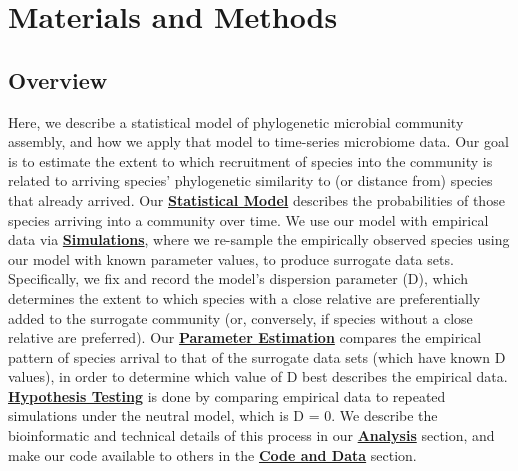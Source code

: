 \documentclass{article}
\begin{document}
\section{Materials and Methods}

\subsection{Overview} \label{sec:overview}
Here, we describe a statistical model of phylogenetic microbial community assembly, and how we apply that model to time-series microbiome data. Our goal is to estimate the extent to which recruitment of species into the community is related to arriving species’ phylogenetic similarity to (or distance from) species that already arrived. Our \hyperref[sec:statisticalModel]{\textbf{Statistical Model}} describes the probabilities of those species arriving into a community over time. We use our model with empirical data via \hyperref[sec:simulations]{\textbf{Simulations}}, where we re-sample the empirically observed species using our model with known parameter values, to produce surrogate data sets. Specifically, we fix and record the model’s dispersion parameter (D), which determines the extent to which species with a close relative are preferentially added to the surrogate community (or, conversely, if species without a close relative are preferred). Our \hyperref[sec:parameterEstimation]{\textbf{Parameter Estimation}} compares the empirical pattern of species arrival to that of the surrogate data sets (which have known D values), in order to determine which value of D best describes the empirical data. \hyperref[sec:hypothesisTesting]{\textbf{Hypothesis Testing}} is done by comparing empirical data to repeated simulations under the neutral model, which is D = 0. We describe the bioinformatic and technical details of this process in our \hyperref[sec:analysis]{\textbf{Analysis}} section, and make our code available to others in the \hyperref[sec:codeAndData]{\textbf{Code and Data}} section. 
\end{document}
